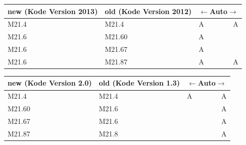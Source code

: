 \begin{centernss}
\renewcommand{\arraystretch}{1.2}
\begin{tabular}{p{136pt}p{136pt}lr}
new (Kode Version 2013) & old (Kode Version 2012) & \multicolumn{2}{c}{$\leftarrow$Auto$\rightarrow$} \\
\hline
M21.4 & M21.4 & A & A \\
M21.6 & M21.60 & A &  \\
M21.6 & M21.67 & A &  \\
M21.6 & M21.87 & A & A \\
\end{tabular}
\end{centernss}

\begin{centernss}
\renewcommand{\arraystretch}{1.2}
\begin{tabular}{p{136pt}p{136pt}lr}
new (Kode Version 2.0) & old (Kode Version 1.3) & \multicolumn{2}{c}{$\leftarrow$Auto$\rightarrow$} \\
\hline
M21.4 & M21.4 & A & A \\
M21.60 & M21.6 &  & A \\
M21.67 & M21.6 &  & A \\
M21.87 & M21.8 &  & A \\
\end{tabular}
\end{centernss}

